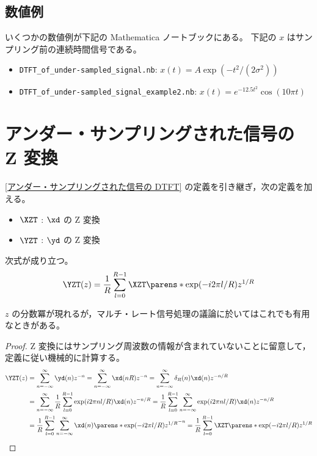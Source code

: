         \subsection{数値例}
            いくつかの数値例が下記の Mathematica ノートブックにある。
            下記の $x$ はサンプリング前の連続時間信号である。
            \begin{itemize}
                \item \verb|DTFT_of_under-sampled_signal.nb|: $x(t) = A\exp(-t^2/(2\sigma^2))$
                \item \verb|DTFT_of_under-sampled_signal_example2.nb|: $x(t) = e^{-12.5 t^2}\cos(10\pi t)$
            \end{itemize}
    \section{アンダー・サンプリングされた信号の Z 変換}
        \ref{アンダー・サンプリングされた信号の DTFT} の定義を引き継ぎ，次の定義を加える。
        \begin{itemize}
            \item $\XZT$ : $\xd$ の Z 変換
            \item $\YZT$ : $\yd$ の Z 変換
        \end{itemize}
        \begin{shadebox}
            次式が成り立つ。
            \[ \YZT(z) = \frac{1}{R}\sum_{l=0}^{R-1} \XZT\parens*{\exp(-i2\pi l/R)z^{1/R}} \]
        \end{shadebox}
        $z$ の分数冪が現れるが，マルチ・レート信号処理の議論に於いてはこれでも有用なときがある。
        \begin{proof}
            \quad\par
            Z 変換にはサンプリング周波数の情報が含まれていないことに留意して，定義に従い機械的に計算する。
            \begin{align*}
                \YZT(z) &= \sum_{n=-\infty}^\infty \yd(n)z^{-n} = \sum_{n=-\infty}^\infty \xd(nR)z^{-n} = \sum_{n=-\infty}^\infty \delta_R(n)\xd(n)z^{-n/R} \\
                &= \sum_{n=-\infty}^\infty \frac{1}{R}\sum_{l=0}^{R-1}\exp(i2\pi nl/R)\xd(n)z^{-n/R} = \frac{1}{R}\sum_{l=0}^{R-1}\sum_{n=-\infty}^\infty \exp(i2\pi nl/R)\xd(n)z^{-n/R} \\
                &= \frac{1}{R}\sum_{l=0}^{R-1}\sum_{n=-\infty}^\infty \xd(n)\parens*{\exp(-i2\pi l/R)z^{1/R}}^{-n} = \frac{1}{R}\sum_{l=0}^{R-1} \XZT\parens*{\exp(-i2\pi l/R)z^{1/R}}
            \end{align*}
        \end{proof}
